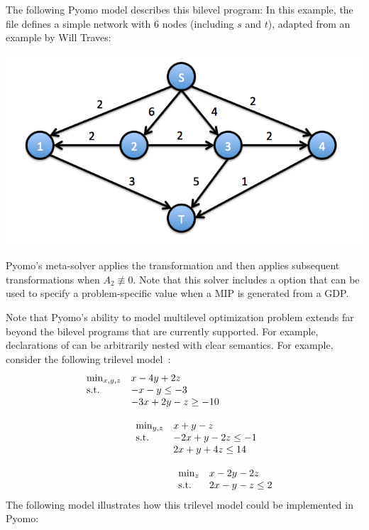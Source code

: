 \newpage
The following Pyomo model describes this bilevel program:
In this example, the file  defines a
simple network with 6 nodes (including $s$ and $t$), adapted from
an example by Will Traves:
\begin{center}
\includegraphics[scale=0.4]{network.png}
\end{center}

Pyomo's  meta-solver applies the
 transformation and then applies subsequent
transformations when $A_2 \not \equiv 0$.
Note that this solver includes a  option that can be
used to specify a problem-specific value when a MIP is generated
from a GDP.



\label{sec:discussion}

Note that Pyomo's ability to model multilevel optimization problem
extends far beyond the bilevel programs that are currently supported.
For example, declarations of  can be arbitrarily
nested with clear semantics.  For example, consider the following trilevel model~\cite{ZhaLuMonZen10}:
\[
\begin{array}{ll}
\min_{x, y, z}  & x - 4y + 2z\\
\textrm{s.t.}             & -x -y \leq -3\\
                & -3x +2y -z \geq -10\\
                & \begin{array}{ll}\\
                    \min_{y,z} & x + y - z\\
                    \textrm{s.t.} & -2x + y -2z \leq -1\\
                        & 2x + y + 4z \leq 14\\
                        & \begin{array}{ll}\\
                            \min_{z} & x - 2y - 2z\\
                            \textrm{s.t.} & 2x - y - z \leq 2
                          \end{array}
                    \end{array}
\end{array}
\]
The following model illustrates how this trilevel model could be implemented in Pyomo:

